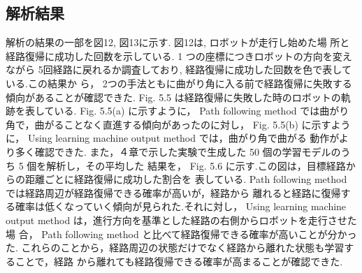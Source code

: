 \documentclass{jarticle}
\begin{document}
\subsection{解析結果}
解析の結果の一部を図12, 図13に示す. 図12は, ロボットが走行し始めた場
所と経路復帰に成功した回数を示している. 1 つの座標につきロボットの方向を変えながら
5回経路に戻れるか調査しており, 経路復帰に成功した回数を色で表している.この結果か
ら， 2つの手法ともに曲がり角に入る前で経路復帰に失敗する傾向があることが確認できた.
Fig. 5.5 は経路復帰に失敗した時のロボットの軌跡を表している. Fig. 5.5(a) に示すように，
Path following method では曲がり角で，曲がることなく直進する傾向があったのに対し，
Fig. 5.5(b) に示すように， Using learning machine output method では，曲がり角で曲がる
動作がより多く確認できた.
また，４章で示した実験で生成した 50 個の学習モデルのうち 5 個を解析し，その平均した
結果を， Fig. 5.6 に示す.この図は，目標経路からの距離ごとに経路復帰に成功した割合を
表している. Path following method では経路周辺が経路復帰できる確率が高いが，経路から
離れると経路に復帰する確率は低くなっていく傾向が見られた.それに対し， Using learning
machine output method は，進行方向を基準とした経路の右側からロボットを走行させた場
合， Path following method と比べて経路復帰できる確率が高いことが分かった.
これらのことから，経路周辺の状態だけでなく経路から離れた状態も学習することで，経路
から離れても経路復帰できる確率が高まることが確認できた.
\end{document}
